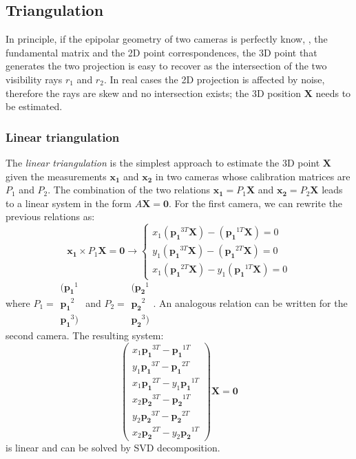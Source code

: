 \subsection{Triangulation}
In principle, if the epipolar geometry of two cameras is perfectly know, \ie, the fundamental matrix and the 2D point correspondences, the 3D point that generates the two projection is easy to recover as the intersection of the two visibility rays $r_1$ and $r_2$. 
In real cases the 2D projection is affected by noise, therefore the rays are skew and no intersection exists; the 3D position $\mathbf{X}$ needs to be estimated.

\subsubsection{Linear triangulation} 
The \emph{linear triangulation} is the simplest approach to estimate the 3D point $\mathbf{X}$ given the measurements $\mathbf{x_1}$ and $\mathbf{x_2}$ in two cameras whose calibration matrices are $P_1$ and $P_2$.
The combination of the two relations $\mathbf{x_1} = P_1 \mathbf{X}$ and $\mathbf{x_2} = P_2 \mathbf{X}$ leads to a linear system in the form $A\mathbf{X} = \mathbf{0}$. 
For the first camera, we can rewrite the previous relations as:
\begin{equation}
  \mathbf{x_1} \times P_1 \mathbf{X} = \mathbf{0} \rightarrow 
  \begin{cases}
    x_1(\mathbf{p_1}^{3T}\mathbf{X}) -    (\mathbf{p_1}^{1T}\mathbf{X}) = 0\\
    y_1(\mathbf{p_1}^{3T}\mathbf{X}) -    (\mathbf{p_1}^{2T}\mathbf{X}) = 0\\
    x_1(\mathbf{p_1}^{2T}\mathbf{X}) - y_1(\mathbf{p_1}^{1T}\mathbf{X}) = 0
  \end{cases}
\end{equation}
where $P_1 = \begin{smallmatrix}(\mathbf{p_1}^1 \\ \mathbf{p_1}^2\\ \mathbf{p_1}^3)\end{smallmatrix}$ and $P_2 = \begin{smallmatrix}(\mathbf{p_2}^1 \\ \mathbf{p_2}^2\\ \mathbf{p_2}^3)\end{smallmatrix}$.
An analogous relation can be written for the second camera.
The resulting system:
\begin{equation}
  \begin{pmatrix}
    x_1\mathbf{p_1}^{3T} -    \mathbf{p_1}^{1T}\\
    y_1\mathbf{p_1}^{3T} -    \mathbf{p_1}^{2T}\\
    x_1\mathbf{p_1}^{2T} - y_1\mathbf{p_1}^{1T}\\
    x_2\mathbf{p_2}^{3T} -    \mathbf{p_2}^{1T}\\
    y_2\mathbf{p_2}^{3T} -    \mathbf{p_2}^{2T}\\
    x_2\mathbf{p_2}^{2T} - y_2\mathbf{p_2}^{1T}
  \end{pmatrix}
  \mathbf{X} = \mathbf{0}
\end{equation}
is linear and can be solved by SVD decomposition.

